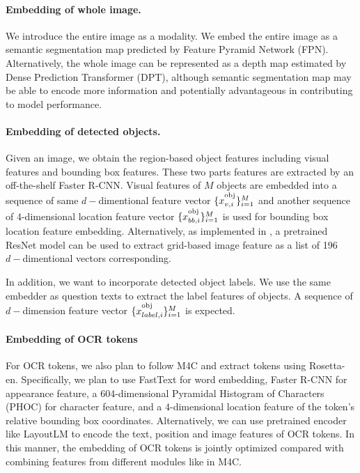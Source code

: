 \documentclass[11pt,a4paper]{article}
\begin{document}
\paragraph{Embedding of whole image.} We introduce the entire image as a modality. We embed the entire image as a semantic segmentation map predicted by Feature Pyramid Network (FPN). Alternatively, the whole image can be represented as a depth map estimated by Dense Prediction Transformer (DPT), although semantic segmentation map may be able to encode more information and potentially advantageous in contributing to model performance. 

\paragraph{Embedding of detected objects.}Given an image, we obtain the region-based object features including visual features and bounding box features. These two parts features are extracted by an off-the-shelf Faster R-CNN. Visual features of $M$ objects are embedded into a sequence of same $d-$dimentional feature vector $\{x^{\textsuperscript{obj}}_{v,i}\}_{i=1}^M$ and another sequence of $4$-dimensional location feature vector $\{x^{\textsuperscript{obj}}_{bb,i}\}_{i=1}^M$ is used for bounding box location feature embedding. Alternatively, as implemented in \citet{gao2020multi}, a pretrained ResNet model can be used to extract grid-based image feature as a list of 196 $d-$dimentional vectors corresponding.    

In addition, we want to incorporate detected object labels. We use the same embedder as question texts to extract the label features of objects. A sequence of $d-$dimension feature vector $\{x^{\textsuperscript{obj}}_{label,i}\}_{i=1}^M$ is expected. 

\paragraph{Embedding of OCR tokens}For OCR tokens, we also plan to follow M4C and extract tokens using Rosetta-en. Specifically, we plan to use FastText for word embedding, Faster R-CNN for appearance feature, a 604-dimensional Pyramidal Histogram of Characters (PHOC) for character feature, and a 4-dimensional location feature of the token’s relative bounding box coordinates. Alternatively, we can use pretrained encoder like LayoutLM to encode the text, position and image features of OCR tokens. In this manner, the embedding of OCR tokens is jointly optimized compared with combining features from different modules like in M4C.
\end{document}
